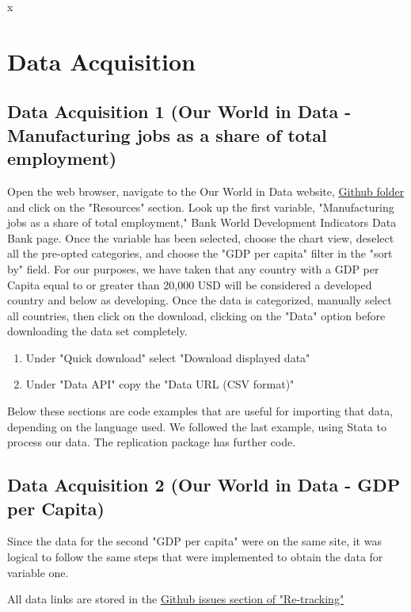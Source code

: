 x\documentclass[12pt]{article}
\begin{document}
\section{Data Acquisition}
\label{sec:theory}


    \subsection{Data Acquisition 1 (Our World in Data - Manufacturing jobs as a share of total employment)}
    
Open the web browser, navigate to the Our World in Data website, \href{https://github.com/ecn310/course-project-development/issues/12}{Github folder} and click on the "Resources" section. Look up the first variable, "Manufacturing jobs as a share of total employment," Bank World Development Indicators Data Bank page. Once the variable has been selected, choose the chart view, deselect all the pre-opted categories, and choose the "GDP per capita" filter in the "sort by" field. For our purposes, we have taken that any country with a GDP per Capita equal to or greater than 20,000 USD will be considered a developed country and below as developing. Once the data is categorized, manually select all countries, then click on the download, clicking on the "Data" option before downloading the data set completely. 
\begin{enumerate}
\item Under "Quick download" select "Download displayed data" 

\item Under "Data API" copy the "Data URL (CSV format)" 

\end{enumerate}

Below these sections are code examples that are useful for importing that data, depending on the language used. We followed the last example, using Stata to process our data. The replication package has further code. 

    \subsection{Data Acquisition 2 (Our World in Data - GDP per Capita)}
Since the data for the second "GDP per capita" were on the same site, it was logical to follow the same steps that were implemented to obtain the data for variable one. 

All data links are stored in the \href{https://github.com/ecn310/course-project-development/issues/15#issuecomment-2486305999}{Github issues section of "Re-tracking"} 
\end{document}
